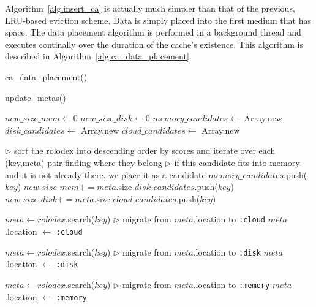 Algorithm~\ref{alg:insert_ca} is actually much simpler than that of the
previous, LRU-based eviction scheme. Data is simply placed into the first
medium that has space. The data placement algorithm is performed in a
background thread and executes continally over the duration of the cache's
existence.  This algorithm is described in
Algorithm~\ref{alg:ca_data_placement}.

\begin{algorithm}[htp]
\small
\caption{\label{alg:ca_data_placement}ca\_data\_placement()}
\begin{algorithmic}[1]
	\STATE update\_metas()

	\STATE $new\_size\_mem \leftarrow 0$
	\STATE $new\_size\_disk \leftarrow 0$
	\STATE $memory\_candidates \leftarrow$ Array.new
	\STATE $disk\_candidates \leftarrow$ Array.new
	\STATE $cloud\_candidates \leftarrow$ Array.new

	\STATE $\triangleright$ sort the rolodex into descending order by scores and
	iterate over each (key,meta) pair finding where they belong
		\STATE $\triangleright$ if this candidate fits into memory and it is not
		already there, we place it as a candidate
				\STATE $memory\_candidates$.push($key$)
			\ENDIF
			\STATE $new\_size\_mem += meta$.size
				\STATE $disk\_candidates$.push($key$)
			\ENDIF
			\STATE $new\_size\_disk += meta$.size
		\ELSE
				\STATE $cloud\_candidates$.push($key$)
			\ENDIF
		\ENDIF
	\ENDFOR

		\STATE $meta \leftarrow rolodex$.search($key$)
		\STATE $\triangleright$ migrate from $meta$.location to {\tt :cloud}
		\STATE $meta$.location $\leftarrow$ {\tt :cloud}
	\ENDFOR
	
		\STATE $meta \leftarrow rolodex$.search($key$)
		\STATE $\triangleright$ migrate from $meta$.location to {\tt :disk}
		\STATE $meta$.location $\leftarrow$ {\tt :disk}
	\ENDFOR

		\STATE $meta \leftarrow rolodex$.search($key$)
		\STATE $\triangleright$ migrate from $meta$.location to {\tt :memory}
		\STATE $meta$.location $\leftarrow$ {\tt :memory}
	\ENDFOR
\ENDWHILE
\end{algorithmic}
\end{algorithm}

